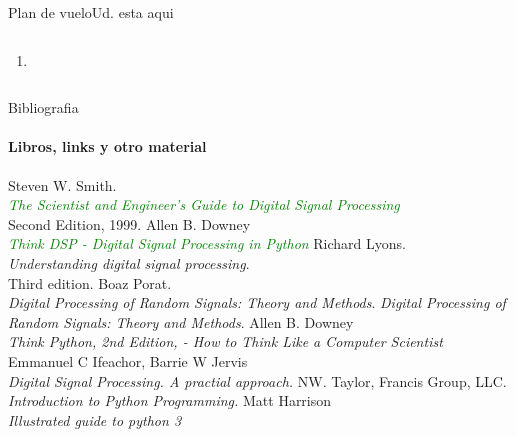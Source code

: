 \begin{frame}{Plan de vuelo}{Ud. esta aqui}
\begin{columns}[onlytextwidth]
\begin{enumerate}
{
             }
          \item{
             }
       \end{enumerate}
    \end{columns}
 \end{frame}
 \begin{frame}{Bibliografia}
    \framesubtitle{Libros, links y otro material}
    \tiny{
       \begin{thebibliography}{1}
             Steven W. Smith. \\
             \textcolor{green}{\emph{The Scientist and Engineer's Guide to Digital Signal Processing}} \\
             Second Edition, 1999.
             Allen B. Downey \\
             \textcolor{green}{\emph{Think DSP - Digital Signal Processing in Python}}
             Richard Lyons. \\
             \emph {Understanding digital signal processing}. \\
             Third edition.
             Boaz Porat. \\
            \emph{Digital Processing of Random Signals: Theory and Methods}.
             \emph{Digital Processing of Random Signals: Theory and Methods}.
             Allen B. Downey \\
             \emph{ Think Python, 2nd Edition, - How to Think Like a Computer Scientist}
             Emmanuel C Ifeachor, Barrie W Jervis \\
             \emph{ Digital Signal Processing. A practial approach.}
             NW. Taylor, Francis Group, LLC.\\
             \emph{ Introduction to Python Programming.}
             Matt Harrison\\
             \emph{ Illustrated guide to python 3}
       \end{thebibliography}
   }
    \end{frame}
